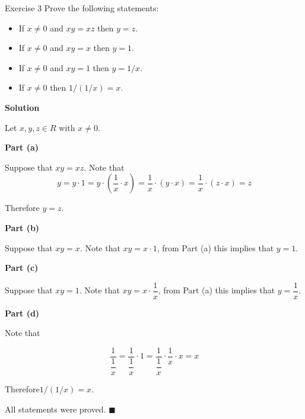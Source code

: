 \documentclass[12pt, a4paper]{article}
\begin{document}
\thispagestyle{fancy}

\begin{exercisebox}{Exercise 3}
Prove the following statements:
\begin{itemize}
    \item[(a)] If $x \neq 0$ and $xy = xz$ then $y = z$.
    \item[(b)] If $x \neq 0$ and $xy = x$ then $y = 1$.
    \item[(c)] If $x \neq 0$ and $xy = 1$ then $y = 1/x$.
    \item[(d)] If $x \neq 0$ then $1/(1/x) = x$.
\end{itemize}
\end{exercisebox}

\textbf{Solution}

Let $x,y,z \in R$ with $x \neq 0$.

\textbf{Part (a)}

Suppose that $xy=xz$. Note that
\[
    y= y \cdot 1= y \cdot (\frac{1}{x}\cdot x)=\frac{1}{x}\cdot(y\cdot x) = \frac{1}{x}\cdot(z\cdot x) = z
\]

Therefore $y=z$. 

\textbf{Part (b)}

Suppose that $xy=x$. Note that $xy = x \cdot 1$, from Part (a) this implies that $y=1$. 

\textbf{Part (c)}

Suppose that $xy=1$. Note that $xy = x \cdot \dfrac{1}{x}$, from Part (a) this implies that $y=\dfrac{1}{x}$. 

\textbf{Part (d)}

Note that

\[
\dfrac{1}{\dfrac{1}{x}} = \dfrac{1}{\dfrac{1}{x}} \cdot 1 = \dfrac{1}{\dfrac{1}{x}} \cdot \dfrac{1}{x} \cdot x =x
\]

Therefore$1/(1/x) = x$. 

All statements were proved. $\blacksquare$
\end{document}
